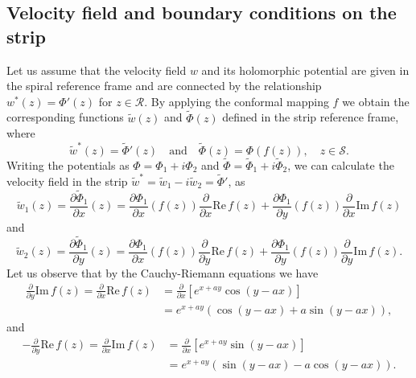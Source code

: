 \documentclass[11pt, letterpaper, reqno]{amsart}
\numberwithin{equation}{section}
\theoremstyle{definition}
\theoremstyle{plain}
\numberwithin{equation}{section}
\def\RR{\mathcal{R}}
\def\SS{\mathcal{S}}
\begin{document}
\subsection{Velocity field and boundary conditions on the strip}\label{sec-frame}
Let us assume that the velocity field $w$ and its holomorphic potential are given in the spiral reference frame and are connected by the 
relationship $w^{*}(z) = \Phi'(z)$ for $z\in\RR$. By applying the conformal mapping $f$ we obtain the corresponding functions $\tilde w(z)$ and $\tilde\Phi(z)$ defined in the strip reference frame, where 
\begin{equation}\label{transform}
\tilde w^{*}(z) = \tilde \Phi'(z) \quad\text{and}\quad  \tilde\Phi(z) = \Phi(f(z)), \quad z\in\SS.
\end{equation}
Writing the potentials as $\Phi = \Phi_{1} + i\Phi_{2}$ and $\tilde\Phi = \tilde \Phi_{1} + i\tilde \Phi_{2}$, we can calculate the velocity field in the strip $\tilde w^{*} = \tilde w_1 - i\tilde w_2 = \tilde \Phi'$, as
\begin{equation}\label{v1}
\tilde w_{1}(z) = \frac{\partial \tilde\Phi_{1}}{\partial x}(z) = \frac{\partial\Phi_{1}}{\partial x}(f(z)) \frac{\partial}{\partial x}\mathrm{Re}\,f(z) + \frac{\partial \Phi_{1}}{\partial y}(f(z)) \frac{\partial}{\partial x}\mathrm{Im}\,f(z)
\end{equation}
and
\begin{equation}\label{v2}
\tilde w_{2}(z) = \frac{\partial \tilde\Phi_{1}}{\partial y}(z) = \frac{\partial \Phi_{1}}{\partial x}(f(z)) \frac{\partial}{\partial y}\mathrm{Re}\,f(z) + \frac{\partial \Phi_{1}}{\partial y}(f(z)) \frac{\partial}{\partial y}\mathrm{Im}\,f(z).
\end{equation}
Let us observe that by the Cauchy-Riemann equations we have
\begin{equation}
\begin{aligned}\label{eq:Re_du}
\frac{\partial}{\partial y} \mathrm{Im}\,f(z) = \frac{\partial}{\partial x} \mathrm{Re}\,f(z) & = \frac{\partial}{\partial x} [e^{x+ay} \cos(y - ax)] \\
&= e^{x+ay} (\cos(y - ax) + a \sin(y - ax)),
\end{aligned}
\end{equation}
and
\begin{equation}
\begin{aligned}\label{eq:Im_du}
-\frac{\partial}{\partial y} \mathrm{Re}\,f(z) = \frac{\partial}{\partial x} \mathrm{Im}\,f(z) & = \frac{\partial}{\partial x} [e^{x+ay} \sin(y - ax)] \\
&= e^{x+ay} (\sin(y - ax) - a \cos(y - ax)).
\end{aligned}
\end{equation}
\end{document}
